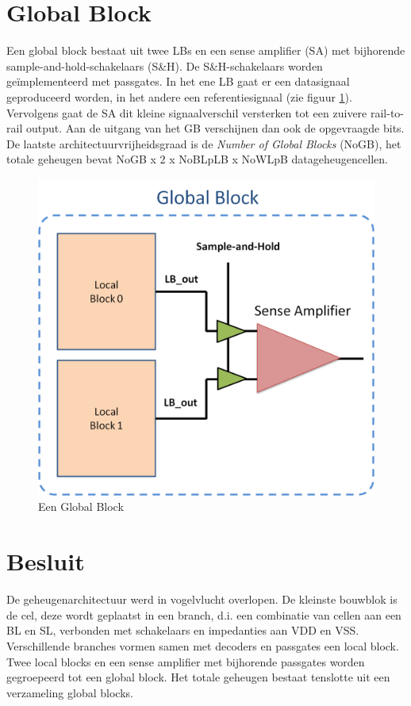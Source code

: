 \section{Global Block}
\label{globalblock}
Een global block bestaat uit twee LBs en een sense amplifier (SA) met bijhorende sample-and-hold-schakelaars (S\&H). De S\&H-schakelaars worden geïmplementeerd met passgates. In het ene LB gaat er een datasignaal geproduceerd worden, in het andere een referentiesignaal (zie figuur \ref{fig:GB}). Vervolgens gaat de SA dit kleine signaalverschil versterken tot een zuivere rail-to-rail output.
Aan de uitgang van het GB verschijnen dan ook de opgevraagde bits.
De laatste architectuurvrijheidsgraad is de \emph{Number of Global Blocks} (NoGB), het totale geheugen bevat NoGB x 2 x NoBLpLB x NoWLpB datageheugencellen.

\begin{figure}
  \centering
  \includegraphics[scale=0.3]{../fig/hfdstk-architecture-globalblock.png}
  \caption{Een Global Block}
  \label{fig:GB}
\end{figure}

\section{Besluit}
De geheugenarchitectuur werd in vogelvlucht overlopen. De kleinste bouwblok is de cel, deze wordt geplaatst in een branch, d.i. een combinatie van cellen aan een BL en SL, verbonden met schakelaars en impedanties aan VDD en VSS. Verschillende branches vormen samen met decoders en passgates een local block. Twee local blocks en een sense amplifier met bijhorende passgates worden gegroepeerd tot een global block. Het totale geheugen bestaat tenslotte uit een verzameling global blocks.


